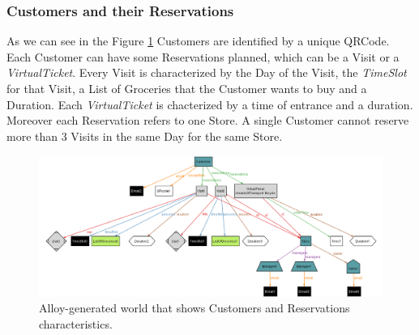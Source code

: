 \documentclass[a4paper, 12pt, oneside]{article}
\begin{document}
\subsubsection{Customers and their Reservations}
As we can see in the Figure \ref{alloy_customer} Customers are identified by a unique QRCode. Each Customer can have some Reservations planned, which can be a Visit or a \textit{VirtualTicket}. Every Visit is characterized by the Day of the Visit, the \textit{TimeSlot} for that Visit, a List of Groceries that the Customer wants to buy and a Duration.  Each \textit{VirtualTicket} is chacterized by a time of entrance and a duration. Moreover each Reservation refers to one Store. A single Customer cannot reserve more than 3 Visits in the same Day for the same Store.
\begin{figure}[h!]
\centering
    \centering
    \includegraphics[height=0.27\textheight, scale=0.3, keepaspectratio]{img/alloy/alloy_customer_reservations.png}
    \caption{Alloy-generated world that shows Customers and Reservations characteristics.}
    \label{alloy_customer}
\end{figure}
\end{document}
